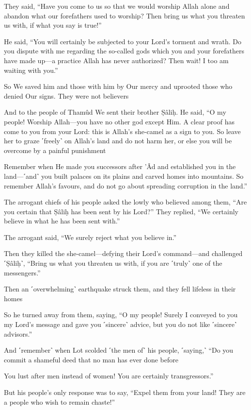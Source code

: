 They said, “Have you come to us so that we would worship Allah alone and abandon what our forefathers used to worship? Then bring us what you threaten us with, if what you say is true!”

He said, “You will certainly be subjected to your Lord’s torment and wrath. Do you dispute with me regarding the so-called gods which you and your forefathers have made up—a practice Allah has never authorized? Then wait! I too am waiting with you.”

So We saved him and those with him by Our mercy and uprooted those who denied Our signs. They were not believers

And to the people of Thamûd We sent their brother Ṣâliḥ. He said, “O my people! Worship Allah—you have no other god except Him. A clear proof has come to you from your Lord: this is Allah’s she-camel as a sign to you. So leave her to graze ˹freely˺ on Allah’s land and do not harm her, or else you will be overcome by a painful punishment

Remember when He made you successors after ’Âd and established you in the land—˹and˺ you built palaces on its plains and carved homes into mountains. So remember Allah’s favours, and do not go about spreading corruption in the land.”

The arrogant chiefs of his people asked the lowly who believed among them, “Are you certain that Ṣâliḥ has been sent by his Lord?” They replied, “We certainly believe in what he has been sent with.”

The arrogant said, “We surely reject what you believe in.”

Then they killed the she-camel—defying their Lord’s command—and challenged ˹Ṣâliḥ˺, “Bring us what you threaten us with, if you are ˹truly˺ one of the messengers.”

Then an ˹overwhelming˺ earthquake struck them, and they fell lifeless in their homes

So he turned away from them, saying, “O my people! Surely I conveyed to you my Lord’s message and gave you ˹sincere˺ advice, but you do not like ˹sincere˺ advisors.”

And ˹remember˺ when Lot scolded ˹the men of˺ his people, ˹saying,˺ “Do you commit a shameful deed that no man has ever done before

You lust after men instead of women! You are certainly transgressors.”

But his people’s only response was to say, “Expel them from your land! They are a people who wish to remain chaste!”

